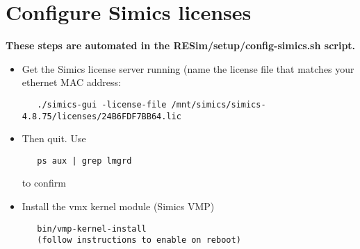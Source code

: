 \documentclass[titlepage]{article}
\begin{document}
\section{Configure Simics licenses}
\textbf{These steps are automated in the RESim/setup/config-simics.sh script.}
\begin{itemize}
\item Get the Simics license server running  (name the license file that matches your ethernet MAC address:
\begin{verbatim}
   ./simics-gui -license-file /mnt/simics/simics-4.8.75/licenses/24B6FDF7BB64.lic
\end{verbatim}

\item Then quit.
Use 
\begin{verbatim}
   ps aux | grep lmgrd 
\end{verbatim}
to confirm

\item Install the vmx kernel module (Simics VMP)
\begin{verbatim}
   bin/vmp-kernel-install
   (follow instructions to enable on reboot)
\end{verbatim}
\end{itemize}
\end{document}
